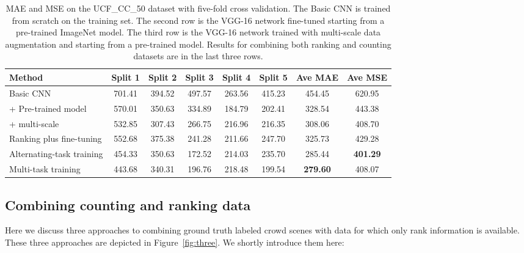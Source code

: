 \documentclass[10pt,twocolumn,letterpaper]{article}
\begin{document}
\begin{table*}
\centering
\begin{tabular}{lccccc|c|c}
\hline
\textbf{Method}          & \textbf{Split 1} & \textbf{Split 2} & \textbf{Split 3} & \textbf{Split 4} & \textbf{Split 5} & \textbf{Ave MAE}  & \textbf{Ave MSE}      \\ \hline \hline
Basic CNN       & 701.41 & 394.52 & 497.57 & 263.56 & 415.23 & 454.45 & 620.95  \\
\: + Pre-trained model       & 570.01 & 350.63 & 334.89 & 184.79 & 202.41 & 328.54 & 443.38  \\
\: + multi-scale       & 532.85 & 307.43 & 266.75 & 216.96 & 216.35 & 308.06 & 408.70 \\
 Ranking plus fine-tuning       & 552.68 & 375.38 &  241.28 & 211.66 & 247.70 & 325.73 &429.28 \\
 Alternating-task training & 454.33 & 350.63 & 172.52 & 214.03 &235.70&  285.44 &\textbf{401.29} \\
 Multi-task training & 443.68 & 340.31 & 196.76 & 218.48 & 199.54 & \textbf{279.60 }  &408.07 \\ \hline

\end{tabular}
\caption{MAE and MSE on the UCF\_CC\_50 dataset with five-fold
  cross validation. The Basic CNN is trained from scratch on the
  training set. The second row is the VGG-16 network fine-tuned
  starting from a pre-trained ImageNet model. The third row is the
  VGG-16 network trained with multi-scale data augmentation and starting from a
  pre-trained model. Results for combining both ranking and counting
  datasets are in the last three rows.}
\label{table:ablation}

\end{table*}

\subsection{Combining counting and ranking data}
Here we discuss three approaches to combining ground truth labeled
crowd scenes with data for which only rank information is
available. These three approaches are depicted in
Figure~\ref{fig:three}. We shortly introduce them here:
\end{document}

